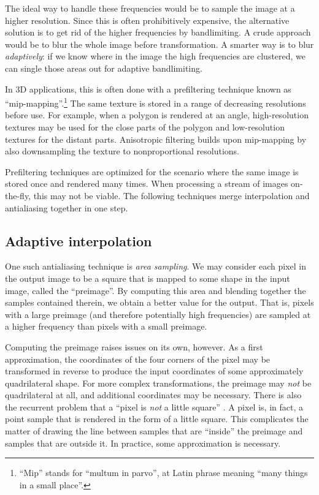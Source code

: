 \documentclass[english,12pt]{ifimaster}
\begin{document}
The ideal way to handle these frequencies would be to sample the image
at a higher resolution. Since this is often prohibitively expensive,
the alternative solution is to get rid of the higher frequencies by
bandlimiting. A crude approach would be to blur the whole image before
transformation. A smarter way is to blur \emph{adaptively}: if we know
where in the image the high frequencies are clustered, we can single
those areas out for adaptive bandlimiting.

In 3D applications, this is often done with a prefiltering technique
known as ``mip-mapping''.\footnote{``Mip'' stands for ``multum in
  parvo'', at Latin phrase meaning ``many things in a small place''.}
The same texture is stored in a range of decreasing resolutions before
use. For example, when a polygon is rendered at an angle,
high-resolution textures may be used for the close parts of the
polygon and low-resolution textures for the distant parts. Anisotropic
filtering builds upon mip-mapping by also downsampling the texture to
nonproportional resolutions.

Prefiltering techniques are optimized for the scenario where the same
image is stored once and rendered many times. When processing a stream
of images on-the-fly, this may not be viable. The following techniques
merge interpolation and antialiasing together in one step.

\subsection{Adaptive interpolation}
\label{sec:adaptiveinterpolation}

One such antialiasing technique is \emph{area sampling}. We may
consider each pixel in the output image to be a square that is mapped
to some shape in the input image, called the ``preimage''. By
computing this area and blending together the samples contained
therein, we obtain a better value for the output. That is, pixels with
a large preimage (and therefore potentially high frequencies) are
sampled at a higher frequency than pixels with a small preimage.

Computing the preimage raises issues on its own, however. As a first
approximation, the coordinates of the four corners of the pixel may be
transformed in reverse to produce the input coordinates of some
approximately quadrilateral shape. For more complex transformations,
the preimage may \emph{not} be quadrilateral at all, and additional
coordinates may be necessary. There is also the recurrent problem that
a ``pixel is \emph{not} a little square'' \citep{smith95:-pixel}. A
pixel is, in fact, a point sample that is rendered in the form of a
little square. This complicates the matter of drawing the line between
samples that are ``inside'' the preimage and samples that are outside
it. In practice, some approximation is necessary.
\end{document}
